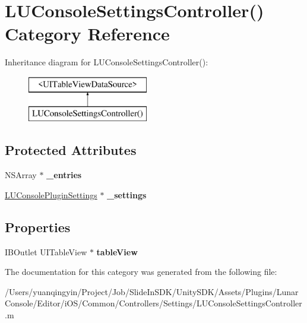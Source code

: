 \hypertarget{category_l_u_console_settings_controller_07_08}{}\section{L\+U\+Console\+Settings\+Controller() Category Reference}
\label{category_l_u_console_settings_controller_07_08}
Inheritance diagram for L\+U\+Console\+Settings\+Controller()\+:\begin{figure}[H]
\begin{center}
\leavevmode
\includegraphics[height=2.000000cm]{category_l_u_console_settings_controller_07_08}
\end{center}
\end{figure}
\subsection*{Protected Attributes}
\begin{DoxyCompactItemize}
\item 
\mbox{\label{category_l_u_console_settings_controller_07_08_aa445b64454a673ae480b7f16c54a2930}} 
N\+S\+Array $\ast$ {\bfseries \+\_\+entries}
\item 
\mbox{\label{category_l_u_console_settings_controller_07_08_aceece4cb42d19907b7f0bf5d6e00edb2}} 
\mbox{\hyperlink{interface_l_u_console_plugin_settings}{L\+U\+Console\+Plugin\+Settings}} $\ast$ {\bfseries \+\_\+settings}
\end{DoxyCompactItemize}
\subsection*{Properties}
\begin{DoxyCompactItemize}
\item 
\mbox{\label{category_l_u_console_settings_controller_07_08_a60db220b500eada73deeb42988f75d83}} 
I\+B\+Outlet U\+I\+Table\+View $\ast$ {\bfseries table\+View}
\end{DoxyCompactItemize}


The documentation for this category was generated from the following file\+:\begin{DoxyCompactItemize}
\item 
/\+Users/yuanqingyin/\+Project/\+Job/\+Slide\+In\+S\+D\+K/\+Unity\+S\+D\+K/\+Assets/\+Plugins/\+Lunar\+Console/\+Editor/i\+O\+S/\+Common/\+Controllers/\+Settings/L\+U\+Console\+Settings\+Controller.\+m\end{DoxyCompactItemize}
